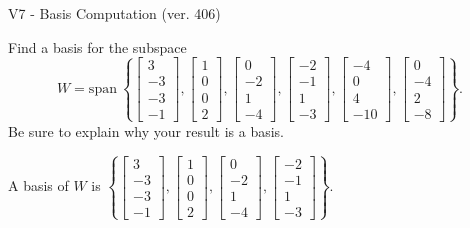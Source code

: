 \begin{exercise}
  \begin{exerciseTitle}V7 - Basis Computation (ver. 406)\end{exerciseTitle}
  \begin{exerciseStatement}
    Find a basis for the subspace 
\[W=\mathrm{span}\ \left\{\left[\begin{array}{r}
3 \\
-3 \\
-3 \\
-1
\end{array}\right] , \left[\begin{array}{r}
1 \\
0 \\
0 \\
2
\end{array}\right] , \left[\begin{array}{r}
0 \\
-2 \\
1 \\
-4
\end{array}\right] , \left[\begin{array}{r}
-2 \\
-1 \\
1 \\
-3
\end{array}\right] , \left[\begin{array}{r}
-4 \\
0 \\
4 \\
-10
\end{array}\right] , \left[\begin{array}{r}
0 \\
-4 \\
2 \\
-8
\end{array}\right]\right\}.\]
 Be sure to explain why your result is a basis.


  \end{exerciseStatement}
  \begin{exerciseAnswer}
   A basis of \(W\) is  \(\left\{\left[\begin{array}{r}
3 \\
-3 \\
-3 \\
-1
\end{array}\right] , \left[\begin{array}{r}
1 \\
0 \\
0 \\
2
\end{array}\right] , \left[\begin{array}{r}
0 \\
-2 \\
1 \\
-4
\end{array}\right] , \left[\begin{array}{r}
-2 \\
-1 \\
1 \\
-3
\end{array}\right]\right\}\).
  


  \end{exerciseAnswer}
\end{exercise}